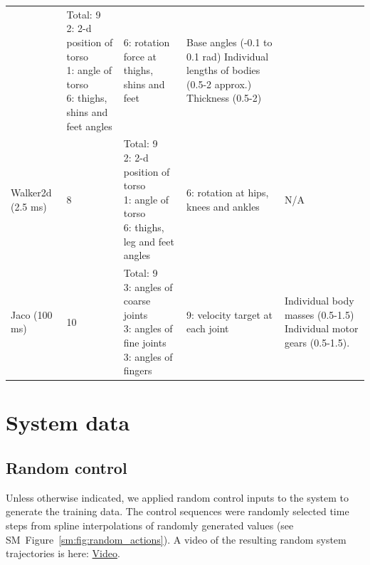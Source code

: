 \begin{minipage}{\columnwidth}
\begin{center}
\begin{small}
\begin{tabular}{p{15mm}p{14mm}p{36mm}p{32mm}p{45mm}}
& {Total: 9
\newline 2: 2-d position of torso
\newline 1: angle of torso
\newline 6: thighs, shins and feet angles}
& {6: rotation force at thighs, shins and feet}
& Base angles (-0.1 to 0.1 rad) 
\newline Individual lengths of bodies (0.5-2 approx.)
\newline Thickness (0.5-2)
\\
Walker2d \newline (2.5 ms) & 8
& {Total: 9
\newline 2: 2-d position of torso
\newline 1: angle of torso
\newline 6: thighs, leg and feet angles}
& {6: rotation at hips, knees and ankles}
& N/A
\\
Jaco \newline (100 ms) & 10 
& {Total: 9
\newline 3: angles of coarse joints
\newline 3: angles of fine joints
\newline 3: angles of fingers}
& {9: velocity target at each joint}
& Individual body masses (0.5-1.5) 
\newline Individual motor gears (0.5-1.5).
\\
\bottomrule
\end{tabular}
\end{small}
\end{center}
\vskip -0.1in
\renewcommand{\arraystretch}{1.}
\end{minipage}

\section{System data}

\subsection{Random control}
\label{sm:sec:random_control}

Unless otherwise indicated, we applied random control inputs to the system to generate the training data. The control sequences were randomly selected time steps from spline interpolations of randomly generated values (see SM~Figure~\ref{sm:fig:random_actions}). A video of the resulting random system trajectories is here: \href{\environmentrandomtrajectories}{Video}.


